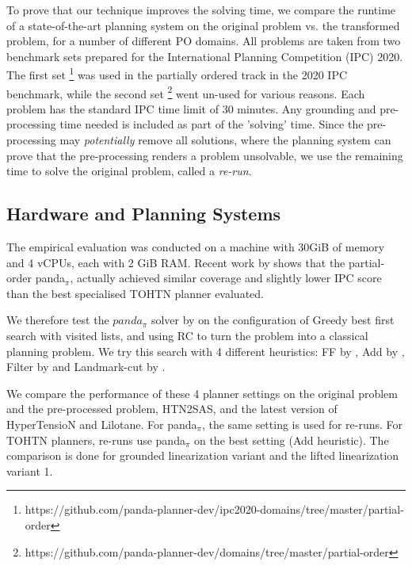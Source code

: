 \documentclass[letterpaper]{article} %
\begin{document}
To prove that our technique improves the solving time, we compare the runtime of a state-of-the-art planning system on the original problem vs. the transformed problem, for a number of different PO domains. All problems are taken from two benchmark sets prepared for the International Planning Competition (IPC) 2020. The first set \footnote{https://github.com/panda-planner-dev/ipc2020-domains/tree/master/partial-order} was used in the partially ordered track in the 2020 IPC benchmark, while the second set \footnote{https://github.com/panda-planner-dev/domains/tree/master/partial-order} went un-used for various reasons. Each problem has the standard IPC time limit of 30 minutes. Any grounding and pre-processing time needed is included as part of the 'solving' time. Since the pre-processing may \emph{potentially} remove all solutions, where the planning system can prove that the pre-processing renders a problem unsolvable, we use the remaining time to solve the original problem, called a \textit{re-run}.

\subsection{Hardware and Planning Systems}
The empirical evaluation was conducted on a machine with 30GiB of memory and 4 vCPUs, each with 2 GiB RAM. Recent work by \cite{HTN2SAS} shows that the partial-order panda$_\pi$, actually achieved similar coverage and slightly lower IPC score than the best specialised TOHTN planner evaluated. %

We therefore test the $panda_{\pi}$ solver by \cite{useClassicalHuristicICAPS18,useClassicalHeuristicIJCAI19,progressionsearchJAIR20} on the configuration of Greedy best first search with visited lists, and using RC to turn the problem into a classical planning problem. We try this search with 4 different heuristics: FF by \cite{FF}, Add by \cite{Add}, Filter by \cite{useClassicalHuristicICAPS18} and Landmark-cut by \cite{LM-Cut}.

We compare the performance of these 4 planner settings on the original problem and the pre-processed problem, HTN2SAS, and the latest version of HyperTensioN and Lilotane. For panda$_{\pi}$, the same setting is used for re-runs. For TOHTN planners, re-runs use panda$_{\pi}$ on the best setting (Add heuristic). The comparison is done for grounded linearization variant and the lifted linearization variant 1.
\end{document}
